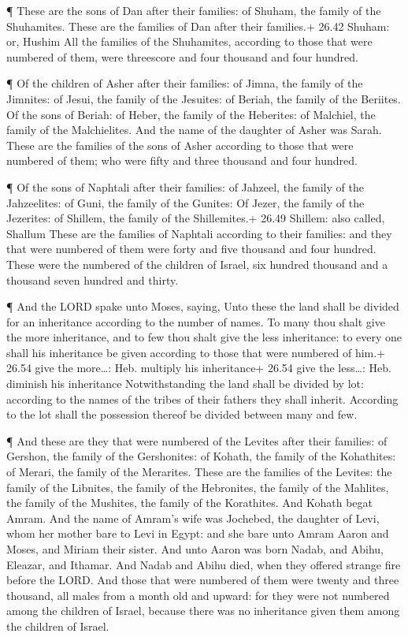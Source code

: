  ¶ These are the sons of Dan after their families: of
Shuham, the family of the Shuhamites. These are the families of Dan
after their families.+ 26.42 Shuham: or, Hushim  All the
families of the Shuhamites, according to those that were numbered of
them, were threescore and four thousand and four hundred.

 ¶ Of the children of Asher after their families: of Jimna,
the family of the Jimnites: of Jesui, the family of the Jesuites: of
Beriah, the family of the Beriites.  Of the sons of Beriah:
of Heber, the family of the Heberites: of Malchiel, the family of the
Malchielites.  And the name of the daughter of Asher was
Sarah.  These are the families of the sons of Asher
according to those that were numbered of them; who were fifty and three
thousand and four hundred.

 ¶ Of the sons of Naphtali after their families: of
Jahzeel, the family of the Jahzeelites: of Guni, the family of the
Gunites:  Of Jezer, the family of the Jezerites: of
Shillem, the family of the Shillemites.+ 26.49 Shillem: also called,
Shallum  These are the families of Naphtali according to
their families: and they that were numbered of them were forty and five
thousand and four hundred.  These were the numbered of the
children of Israel, six hundred thousand and a thousand seven hundred
and thirty.

 ¶ And the LORD spake unto Moses, saying, 
Unto these the land shall be divided for an inheritance according to the
number of names.  To many thou shalt give the more
inheritance, and to few thou shalt give the less inheritance: to every
one shall his inheritance be given according to those that were numbered
of him.+ 26.54 give the more\ldots: Heb. multiply his inheritance+ 26.54
give the less\ldots: Heb. diminish his inheritance 
Notwithstanding the land shall be divided by lot: according to the names
of the tribes of their fathers they shall inherit. 
According to the lot shall the possession thereof be divided between
many and few.

 ¶ And these are they that were numbered of the Levites
after their families: of Gershon, the family of the Gershonites: of
Kohath, the family of the Kohathites: of Merari, the family of the
Merarites.  These are the families of the Levites: the
family of the Libnites, the family of the Hebronites, the family of the
Mahlites, the family of the Mushites, the family of the Korathites. And
Kohath begat Amram.  And the name of Amram's wife was
Jochebed, the daughter of Levi, whom her mother bare to Levi in Egypt:
and she bare unto Amram Aaron and Moses, and Miriam their sister.
 And unto Aaron was born Nadab, and Abihu, Eleazar, and
Ithamar.  And Nadab and Abihu died, when they offered
strange fire before the LORD.  And those that were numbered
of them were twenty and three thousand, all males from a month old and
upward: for they were not numbered among the children of Israel, because
there was no inheritance given them among the children of Israel.

